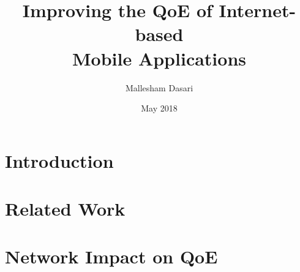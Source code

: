 \documentclass[12pt]{cmuthesis}
\begin{document}
 
\frontmatter

\pagestyle{empty}

\title{ %
{\bf Improving the QoE of Internet-based \\ Mobile Applications}}
\author{Mallesham Dasari}
\date{May 2018}
\trnumber{}



\maketitle
\pagestyle{plain} %


\begin{abstract}
    
\end{abstract}



\tableofcontents
\color{blue}
\color{black}
\mainmatter

\chapter{Introduction}

\chapter{Related Work}


\chapter{Network Impact on QoE}








\end{document}
